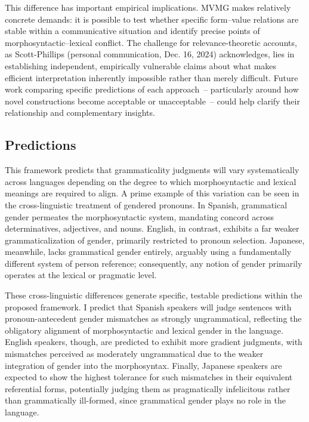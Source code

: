 \documentclass[12pt,letterpaper]{article}
\begin{document}
This difference has important empirical implications. MVMG makes relatively concrete demands: it is possible to test whether specific form--value relations are stable within a communicative situation and identify precise points of morphosyntactic--lexical conflict. The challenge for relevance-theoretic accounts, as Scott-Phillips (personal communication, Dec. 16, 2024) acknowledges, lies in establishing independent, empirically vulnerable claims about what makes efficient interpretation inherently impossible rather than merely difficult. Future work comparing specific predictions of each approach~--  particularly around how novel constructions become acceptable or unacceptable~--  could help clarify their relationship and complementary insights.

\subsection{Predictions}

This framework predicts that grammaticality judgments will vary systematically across languages depending on the degree to which morphosyntactic and lexical meanings are required to align. A prime example of this variation can be seen in the cross-linguistic treatment of gendered pronouns. In Spanish, grammatical gender permeates the morphosyntactic system, mandating concord across determinatives, adjectives, and nouns. English, in contrast, exhibits a far weaker grammaticalization of gender, primarily restricted to pronoun selection. Japanese, meanwhile, lacks grammatical gender entirely, arguably using a fundamentally different system of person reference; consequently, any notion of gender primarily operates at the lexical or pragmatic level.

These cross-linguistic differences generate specific, testable predictions within the proposed framework.  I predict that Spanish speakers will judge sentences with pronoun-antecedent gender mismatches as strongly ungrammatical, reflecting the obligatory alignment of morphosyntactic and lexical gender in the language. English speakers, though, are predicted to exhibit more gradient judgments, with mismatches perceived as moderately ungrammatical due to the weaker integration of gender into the morphosyntax. Finally, Japanese speakers are expected to show the highest tolerance for such mismatches in their equivalent referential forms, potentially judging them as pragmatically infelicitous rather than grammatically ill-formed, since grammatical gender plays no role in the language.
\end{document}
